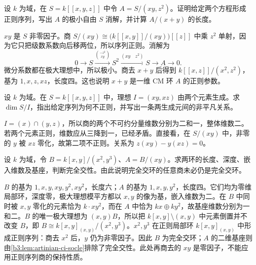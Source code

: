 \begin{exercise}\label{b3:ex:19-two-equation-koszul}
	设 \(k\) 为域，在 \(S=k[\![x,y,z]\!]\) 中令 \(A=S/(xy,z^2)\)。证明给定两个方程形成正则序列，写出 \(A\) 的极小自由 \(S\) 消解，并计算 \(A/(x+y)\) 的长度。
\end{exercise}
\begin{solution}
	\(xy\) 是 \(S\) 非零因子。商 \(S/(xy)\cong\bigl(k[\![x,y]\!]/(xy)\bigr)[\![z]\!]\) 中乘 \(z^2\) 单射，因为它只把级数系数向后移两位，所以序列正则。消解为
	\[
		0\longrightarrow S\xrightarrow{\binom{-z^2}{xy}}S^2 \xrightarrow{(xy\quad z^2)}S\longrightarrow A\longrightarrow0.
	\]
	微分系数都在极大理想中，所以极小。商去 \(x+y\) 后得到 \(k[\![x,z]\!]/(x^2,z^2)\)，基为 \(1,x,z,xz\)，长度四。这也说明 \(x+y\) 是一维 CM 环 \(A\) 的正则参数。
\end{solution}

\begin{exercise}\label{b3:ex:19-redundant-equations}
	设 \(k\) 为域。在 \(S=k[\![x,y,z]\!]\) 中，理想 \(I=(xy,xz)\) 由两个元素生成。求 \(\dim S/I\)，指出给定序列为何不正则，并写出一条两生成元间的非平凡关系。
\end{exercise}
\begin{solution}
	\(I=(x)\cap(y,z)\)，所以商的两个不可约分量维数分别为二和一，整体维数二。若两个元素正则，维数应从三降到一，已经矛盾。直接看，在 \(S/(xy)\) 中，非零的 \(y\) 被 \(xz\) 零化，故第二项不正则。关系为 \(z(xy)-y(xz)=0\)。
\end{solution}

\begin{exercise}\label{b3:ex:19-square-zero-not-ci}
	设 \(k\) 为域，令 \(B=k[x,y]/(x^2,y^3)\)、\(A=B/(xy)\)。求两环的长度、深度、嵌入维数及基座，判断完全交性。由此说明完全交环的任意商未必仍是完全交环。
\end{exercise}
\begin{solution}
	\(B\) 的基为 \(1,x,y,xy,y^2,xy^2\)，长度六；\(A\) 的基为 \(1,x,y,y^2\)，长度四。它们均为零维局部环，深度零，极大理想模平方都以 \(x,y\) 的像为基，嵌入维数为二。在 \(B\) 中同时被 \(x,y\) 零化的元素恰为 \(k\cdot xy^2\)，而在 \(A\) 中恰为 \(kx\oplus ky^2\)，故基座维数分别为一和二。\(B\) 的唯一极大理想为 \((x,y)B\)，所以把 \(k[x,y]\setminus(x,y)\) 中元素倒置并不改变 \(B\)，即 \(B\cong k[x,y]_{(x,y)}/(x^2,y^3)\)。\(x^2,y^3\) 在正则局部环 \(k[x,y]_{(x,y)}\) 中形成正则序列：商去 \(x^2\) 后，\(y\) 仍为非零因子。因此 \(B\) 为完全交环；\(A\) 的二维基座则由\cref{b3:lem:artinian-ci-socle}排除了完全交性。此处再商去的 \(xy\) 是零因子，不能应用正则序列商的保持性质。
\end{solution}


